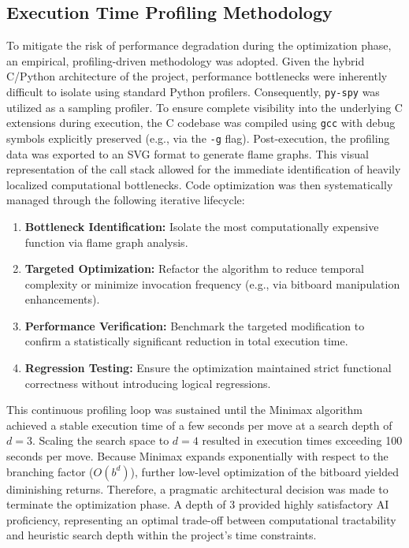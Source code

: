 \subsection{Execution Time Profiling Methodology}

To mitigate the risk of performance degradation during the optimization phase, an empirical, profiling-driven methodology was adopted. Given the hybrid C/Python architecture of the project, performance bottlenecks were inherently difficult to isolate using standard Python profilers. Consequently, \texttt{py-spy} was utilized as a sampling profiler. To ensure complete visibility into the underlying C extensions during execution, the C codebase was compiled using \texttt{gcc} with debug symbols explicitly preserved (e.g., via the \texttt{-g} flag). Post-execution, the profiling data was exported to an SVG format to generate flame graphs. This visual representation of the call stack allowed for the immediate identification of heavily localized computational bottlenecks. Code optimization was then systematically managed through the following iterative lifecycle:

\begin{enumerate}
  \item \textbf{Bottleneck Identification:} Isolate the most computationally expensive function via flame graph analysis.
  \item \textbf{Targeted Optimization:} Refactor the algorithm to reduce temporal complexity or minimize invocation frequency (e.g., via bitboard manipulation enhancements).
  \item \textbf{Performance Verification:} Benchmark the targeted modification to confirm a statistically significant reduction in total execution time.
  \item \textbf{Regression Testing:} Ensure the optimization maintained strict functional correctness without introducing logical regressions.
\end{enumerate}

This continuous profiling loop was sustained until the Minimax algorithm achieved a stable execution time of a few seconds per move at a search depth of $d=3$. Scaling the search space to $d=4$ resulted in execution times exceeding 100 seconds per move. Because Minimax expands exponentially with respect to the branching factor ($O(b^d)$), further low-level optimization of the bitboard yielded diminishing returns. Therefore, a pragmatic architectural decision was made to terminate the optimization phase. A depth of 3 provided highly satisfactory AI proficiency, representing an optimal trade-off between computational tractability and heuristic search depth within the project's time constraints.

